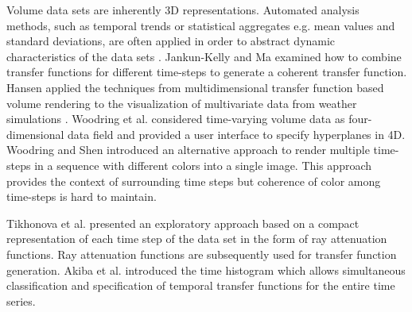 \documentclass{egpubl}
\begin{document}


Volume data sets are inherently 3D representations. Automated analysis methods, such as temporal trends or statistical aggregates e.g. mean values and standard deviations, are often applied in order to abstract dynamic characteristics of the data sets \cite{kehrer_visualization_2013}.
Jankun-Kelly and Ma \cite{jankun-kelly_study_2001} examined how to combine transfer functions for different time-steps to generate a coherent transfer function.
Hansen applied the techniques from multidimensional transfer function based volume rendering to the visualization of multivariate data from weather simulations \cite{kniss_volume_2002}.
Woodring et al. \cite{woodring_high_2003} considered time-varying volume data as four-dimensional data field and provided a user interface to specify hyperplanes in 4D.
Woodring and Shen \cite{woodring_chronovolumes_2003} introduced an alternative approach to render multiple time-steps in a sequence with different colors into a single image. This approach provides the context of surrounding time steps but coherence of color among time-steps is hard to maintain.

Tikhonova et al. \cite{tikhonova_exploratory_2010} presented an exploratory approach based on a compact representation of each time step of the data set in the form of ray attenuation functions. Ray attenuation functions are subsequently used for transfer function generation.
Akiba et al. \cite{akiba_simultaneous_2006} introduced the time histogram which allows simultaneous classification and specification of temporal transfer functions for the entire time series.
\end{document}
